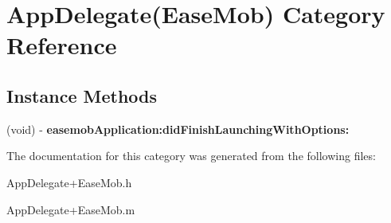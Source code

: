 \hypertarget{category_app_delegate_07_ease_mob_08}{}\section{App\+Delegate(Ease\+Mob) Category Reference}
\label{category_app_delegate_07_ease_mob_08}
\subsection*{Instance Methods}
\begin{DoxyCompactItemize}
\item 
\hypertarget{category_app_delegate_07_ease_mob_08_ae72eb8c4bc0a5bcfba6f2399bbc31fbe}{}(void) -\/ {\bfseries easemob\+Application\+:did\+Finish\+Launching\+With\+Options\+:}\label{category_app_delegate_07_ease_mob_08_ae72eb8c4bc0a5bcfba6f2399bbc31fbe}

\end{DoxyCompactItemize}


The documentation for this category was generated from the following files\+:\begin{DoxyCompactItemize}
\item 
App\+Delegate+\+Ease\+Mob.\+h\item 
App\+Delegate+\+Ease\+Mob.\+m\end{DoxyCompactItemize}
